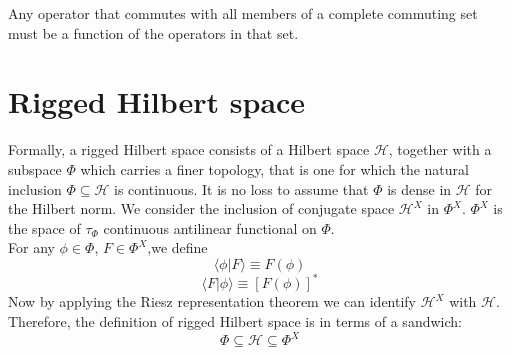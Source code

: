 \begin{newthem}
Any operator that commutes with all members of a complete commuting set must be a function of the operators in that set.
\end{newthem}

\section{Rigged Hilbert space}
\begin{newdef}
Formally, a rigged Hilbert space consists of a Hilbert space $\mathcal{H}$, together with a subspace $\Phi$ which carries a finer topology, that is one for which the natural inclusion $\Phi \subseteq \mathcal{H}$ is continuous. 
It is no loss to assume that $\Phi$ is dense in $\mathcal{H}$ for the Hilbert norm. We consider the inclusion of conjugate space $\mathcal{H}^X$ in $\Phi^X$. $\Phi^X$ is the space of $\tau_{\Phi}$ continuous antilinear functional on $\Phi$.\\
For any $\phi \in \Phi$, $F \in \Phi^X$,we define
\[\langle \phi | F \rangle \equiv F(\phi)\]
\[\langle F | \phi \rangle \equiv [F(\phi)]^*\]
Now by applying the Riesz representation theorem we can identify $\mathcal{H}^X$ with $\mathcal{H}$. Therefore, the definition of rigged Hilbert space is in terms of a sandwich:
\[\Phi \subseteq \mathcal{H} \subseteq \Phi^X\]
\end{newdef}

